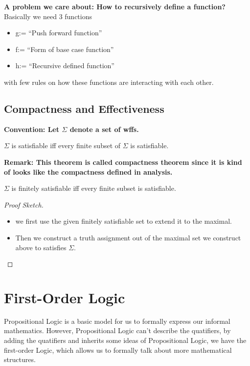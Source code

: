 \documentclass[11pt]{article}
\begin{document}
\begin{definition}

\end{definition}
\textbf{A problem we care about: How to recursively define a function?}
Basically we need 3 functions
\begin{itemize}
\item g:= ``Push forward function''
\item f:= ``Form of base case function''
\item h:= ``Recursive defined function''
\end{itemize}
with few rules on how these functions are interacting with each other.
\subsection{Compactness and Effectiveness}
\label{sec:orgcf93293}
\textbf{Convention: Let \(\Sigma\) denote a set of wffs.}
\begin{theorem}
\(\Sigma\) is satisfiable iff every finite subset of \(\Sigma\) is satisfiable.
\end{theorem}

\textbf{Remark: This theorem is called compactness theorem since it is kind of looks like the compactness defined in analysis.}

\begin{definition}
\(\Sigma\) is finitely satisfiable iff every finite subset is satisfiable.
\end{definition}


\begin{proof}[Proof Sketch]
\leavevmode

\begin{itemize}
\item we first use the given finitely satisfiable set to extend it to the maximal.
\item Then we construct a truth assignment out of the maximal set we construct above to satisfies \(\Sigma\).
\end{itemize}
\end{proof}
\section{First-Order Logic}
\label{sec:orgfc04e4b}
Propositional Logic is a basic model for us to formally express our informal mathematics. However, Propositional Logic can't describe the quatifiers, by adding the quatifiers and inherits some ideas of Propositional Logic, we have the first-order Logic, which allows us to formally talk about more mathematical structures.
\end{document}
